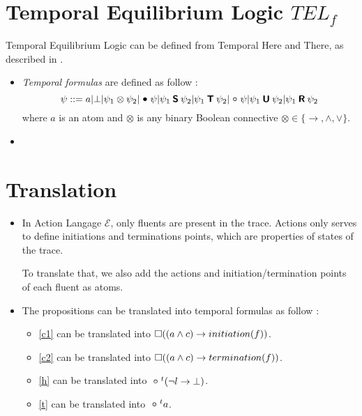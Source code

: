 \section{Temporal Equilibrium Logic $TEL_f$}\label{sec:telf}

Temporal Equilibrium Logic can be defined from Temporal Here and There, as described in \cite{cakascsc18a}.

\begin{itemize}
  \item \emph{Temporal formulas} are defined as follow :
  $$\psi ::= a | \bot | \psi_1\otimes\psi_2 | \previous\psi | \psi_1\since\psi_2 | \psi_1\trigger\psi_2 | \next\psi | \psi_1\until\psi_2 | \psi_1\release\psi_2 $$
  where $a$ is an atom and $\otimes$ is any binary Boolean connective $\otimes \in \{\rightarrow, \wedge, \vee\}$.
  \item
\end{itemize}

\section{Translation}\label{sec:trans}

\begin{itemize}
  \item In Action Langage $\mathcal{E}$, only fluents are present in the trace. Actions only serves to define initiations and terminations points, which are properties of states of the trace.

  To translate that, we also add the actions and initiation/termination points of each fluent as atoms.
  \item The propositions can be translated into temporal formulas as follow :
  \begin{itemize}
    \item \ref{c1} can be translated into $\square((a\land c)\rightarrow initiation(f))$.
    \item \ref{c2} can be translated into $\square((a\land c)\rightarrow termination(f))$.
    \item \ref{h} can be translated into $\next^{t}(\neg l\rightarrow \bot)$.
    \item \ref{t} can be translated into $\next^{t}a$.
  \end{itemize}
\end{itemize}
